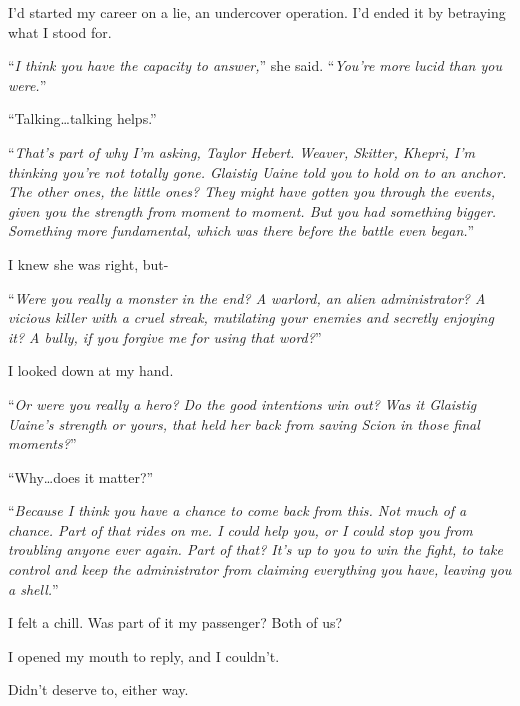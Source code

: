 I'd started my career on a lie, an undercover operation.  I'd ended it by betraying what I stood for.



``\emph{I think you have the capacity to answer,}'' she said.  ``\emph{You're more lucid than you were.}''



``Talking\ldots talking helps.''



``\emph{That's part of why I'm asking, Taylor Hebert.  Weaver, Skitter, Khepri, I'm thinking you're not totally gone.  Glaistig Uaine told you to hold on to an anchor.  The other ones, the little ones?  They might have gotten you through the events, given you the strength from moment to moment.  But you had something bigger.  Something more fundamental, which was there before the battle even began.}''



I knew she was right, but-



``\emph{Were you really a monster in the end?  A warlord, an alien administrator?  A vicious killer with a cruel streak, mutilating your enemies and secretly enjoying it?  A bully, if you forgive me for using that word?}''



I looked down at my hand.



``\emph{Or were you really a hero?  Do the good intentions win out? }\emph{Was it Glaistig Uaine's strength or yours, that held her back from saving Scion in those final moments?}''



``Why\ldots does it matter?''



``\emph{Because I think you have a chance to come back from this.  Not much of a chance.  Part of that rides on me.  I could help you, or I could stop you from troubling anyone ever again.  Part of that?  It's up to you to win the fight, to take control and keep the administrator from claiming everything you have, leaving you a shell.}''



I felt a chill.  Was part of it my passenger?  Both of us?



I opened my mouth to reply, and I couldn't.



Didn't deserve to, either way.



